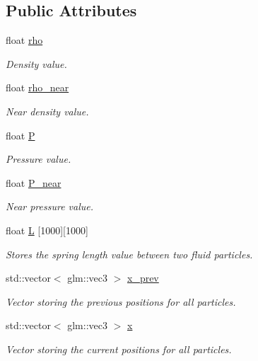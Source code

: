 \subsection*{Public Attributes}
\begin{DoxyCompactItemize}
\item 
float \hyperlink{classscene_a0154fc603318164e75123be413dd7d48}{rho}
\begin{DoxyCompactList}\small\item\em Density value. \end{DoxyCompactList}\item 
float \hyperlink{classscene_a60b59a93c6e8f6f7ffa1f56a9c5f8f72}{rho\+\_\+near}
\begin{DoxyCompactList}\small\item\em Near density value. \end{DoxyCompactList}\item 
float \hyperlink{classscene_a40cf76b52a836034c27c5637a174caf1}{P}
\begin{DoxyCompactList}\small\item\em Pressure value. \end{DoxyCompactList}\item 
float \hyperlink{classscene_abab4e59ae9fd1f4fce19dd17a69d8144}{P\+\_\+near}
\begin{DoxyCompactList}\small\item\em Near pressure value. \end{DoxyCompactList}\item 
float \hyperlink{classscene_a5567d1a6ee5b2f47e667f37738193b70}{L} \mbox{[}1000\mbox{]}\mbox{[}1000\mbox{]}
\begin{DoxyCompactList}\small\item\em Stores the spring length value between two fluid particles. \end{DoxyCompactList}\item 
std\+::vector$<$ glm\+::vec3 $>$ \hyperlink{classscene_a1f3d0e6a319b04ba81ea27b862a1278a}{x\+\_\+prev}
\begin{DoxyCompactList}\small\item\em Vector storing the previous positions for all particles. \end{DoxyCompactList}\item 
std\+::vector$<$ glm\+::vec3 $>$ \hyperlink{classscene_aa74e8461ea4ee06a07c00c7185d9c9ab}{x}
\begin{DoxyCompactList}\small\item\em Vector storing the current positions for all particles. \end{DoxyCompactList}\item 

\end{DoxyCompactItemize}
